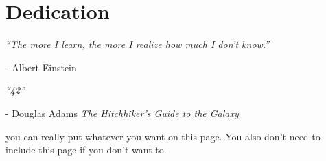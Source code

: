 \chapter*{Dedication}

{\centering
\textit{``The more I learn, the more I realize how much I don't know.''}

- Albert Einstein

\medskip

\textit{``42''}

- Douglas Adams \textit{The Hitchhiker's Guide to the Galaxy}

\medskip

you can really put whatever you want on this page. You also don't need to include this page if you don't want to.

}
